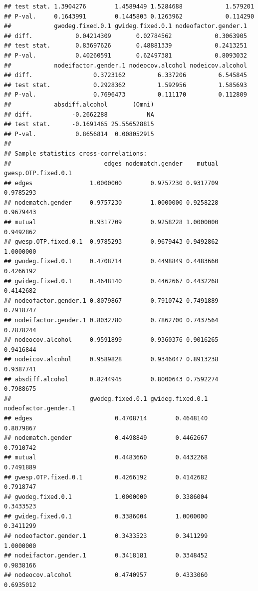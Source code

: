 \documentclass[
]{article}
\begin{document}
\begin{verbatim}
## test stat. 1.3904276        1.4589449 1.5284688            1.579201
## P-val.     0.1643991        0.1445803 0.1263962            0.114290
##            gwodeg.fixed.0.1 gwideg.fixed.0.1 nodeofactor.gender.1
## diff.            0.04214309       0.02784562            0.3063905
## test stat.       0.83697626       0.48881339            0.2413251
## P-val.           0.40260591       0.62497381            0.8093032
##            nodeifactor.gender.1 nodeocov.alcohol nodeicov.alcohol
## diff.                 0.3723162         6.337206         6.545845
## test stat.            0.2928362         1.592956         1.585693
## P-val.                0.7696473         0.111170         0.112809
##            absdiff.alcohol       (Omni)
## diff.           -0.2662288           NA
## test stat.      -0.1691465 25.556528815
## P-val.           0.8656814  0.008052915
## 
## Sample statistics cross-correlations:
##                          edges nodematch.gender    mutual gwesp.OTP.fixed.0.1
## edges                1.0000000        0.9757230 0.9317709           0.9785293
## nodematch.gender     0.9757230        1.0000000 0.9258228           0.9679443
## mutual               0.9317709        0.9258228 1.0000000           0.9492862
## gwesp.OTP.fixed.0.1  0.9785293        0.9679443 0.9492862           1.0000000
## gwodeg.fixed.0.1     0.4708714        0.4498849 0.4483660           0.4266192
## gwideg.fixed.0.1     0.4648140        0.4462667 0.4432268           0.4142682
## nodeofactor.gender.1 0.8079867        0.7910742 0.7491889           0.7918747
## nodeifactor.gender.1 0.8032780        0.7862700 0.7437564           0.7878244
## nodeocov.alcohol     0.9591899        0.9360376 0.9016265           0.9416844
## nodeicov.alcohol     0.9589828        0.9346047 0.8913238           0.9387741
## absdiff.alcohol      0.8244945        0.8000643 0.7592274           0.7988675
##                      gwodeg.fixed.0.1 gwideg.fixed.0.1 nodeofactor.gender.1
## edges                       0.4708714        0.4648140            0.8079867
## nodematch.gender            0.4498849        0.4462667            0.7910742
## mutual                      0.4483660        0.4432268            0.7491889
## gwesp.OTP.fixed.0.1         0.4266192        0.4142682            0.7918747
## gwodeg.fixed.0.1            1.0000000        0.3386004            0.3433523
## gwideg.fixed.0.1            0.3386004        1.0000000            0.3411299
## nodeofactor.gender.1        0.3433523        0.3411299            1.0000000
## nodeifactor.gender.1        0.3418181        0.3348452            0.9838166
## nodeocov.alcohol            0.4740957        0.4333060            0.6935012

\end{verbatim}
\end{document}

